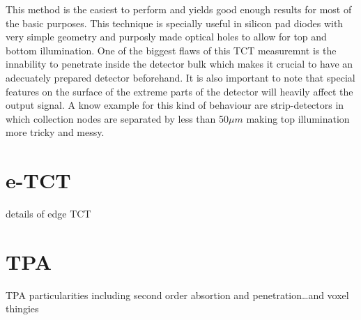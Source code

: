 This method is the easiest to perform and yields good enough results for most of the basic purposes. This technique is specially useful in silicon pad diodes with very simple geometry and purposly made optical holes to allow for top and bottom illumination. One of the biggest flaws of this TCT measuremnt is the innability to penetrate inside the detector bulk which makes it crucial to have an adecuately prepared detector beforehand. It is also important to note that special features on the surface of the extreme parts of the detector will heavily affect the output signal. A know example for this kind of behaviour are strip-detectors in which collection nodes are separated by less than 50$\mu m$ making top illumination more tricky and messy.

\section{e-TCT} %
\label{sec:fitting_method}

details of edge TCT


\section{TPA} %
\label{sec:results_and_comparison_with_tracs_rad}

TPA particularities including second order absortion and penetration\ldots and voxel thingies


